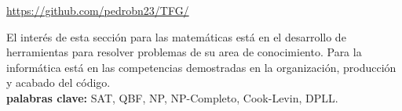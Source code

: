 \begin{center}
  \url{https://github.com/pedrobn23/TFG/}
\end{center}

El interés de esta sección para las matemáticas está en el desarrollo de herramientas para resolver problemas de su area de conocimiento. Para la informática está en las competencias demostradas en la organización, producción y acabado del código.\\

\textbf{palabras clave:} SAT, QBF, NP, NP-Completo, Cook-Levin, DPLL.




